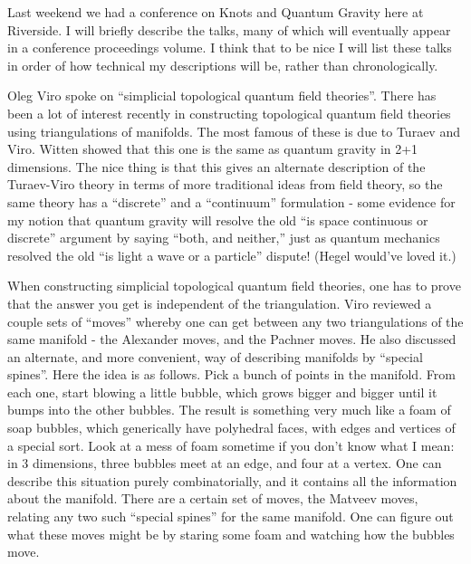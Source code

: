 \documentclass{article}
\begin{document}
Last weekend we had a conference on Knots and Quantum Gravity here at
Riverside. I will briefly describe the talks, many of which will
eventually appear in a conference proceedings volume. I think that to be
nice I will list these talks in order of how technical my descriptions
will be, rather than chronologically.

Oleg Viro spoke on ``simplicial topological quantum field theories''.
There has been a lot of interest recently in constructing topological
quantum field theories using triangulations of manifolds. The most
famous of these is due to Turaev and Viro. Witten showed that this one
is the same as quantum gravity in 2+1 dimensions. The nice thing is that
this gives an alternate description of the Turaev-Viro theory in terms
of more traditional ideas from field theory, so the same theory has a
``discrete'' and a ``continuum'' formulation - some evidence for my
notion that quantum gravity will resolve the old ``is space continuous
or discrete'' argument by saying ``both, and neither,'' just as quantum
mechanics resolved the old ``is light a wave or a particle'' dispute!
(Hegel would've loved it.)

When constructing simplicial topological quantum field theories, one has
to prove that the answer you get is independent of the triangulation.
Viro reviewed a couple sets of ``moves'' whereby one can get between any
two triangulations of the same manifold - the Alexander moves, and the
Pachner moves. He also discussed an alternate, and more convenient, way
of describing manifolds by ``special spines''. Here the idea is as
follows. Pick a bunch of points in the manifold. From each one, start
blowing a little bubble, which grows bigger and bigger until it bumps
into the other bubbles. The result is something very much like a foam of
soap bubbles, which generically have polyhedral faces, with edges and
vertices of a special sort. Look at a mess of foam sometime if you don't
know what I mean: in 3 dimensions, three bubbles meet at an edge, and
four at a vertex. One can describe this situation purely
combinatorially, and it contains all the information about the manifold.
There are a certain set of moves, the Matveev moves, relating any two
such ``special spines'' for the same manifold. One can figure out what
these moves might be by staring some foam and watching how the bubbles
move.
\end{document}
